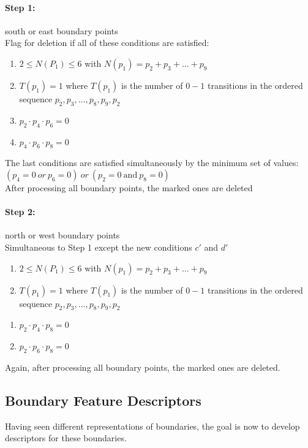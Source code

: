 \paragraph{Step 1:} south or east boundary points\\
Flag for deletion if all of these conditions are satisfied:
\begin{enumerate}[label={\alph*)}]
\item $2\leq N(P_1)\leq 6$ with $N(p_1)=p_2 + p_3 + \ldots + p_9$
\item $T(p_1)=1$ where $T(p_1)$ is the number of $0-1$ transitions in the ordered sequence $p_2,p_3,\ldots ,p_8,p_9,p_2$
\item $p_2 \cdot p_4 \cdot p_6 = 0$
\item $p_4 \cdot p_6 \cdot p_8 = 0$
\end{enumerate}
The last conditions are satisfied simultaneously by the minimum set of values: $(p_4=0\ or\ p_6=0)\ or \ (p_2=0\ \text{and} \ p_8=0)$\\
After processing all boundary points, the marked ones are deleted
\paragraph{Step 2:} north or west boundary points\\
Simultaneous to Step 1 except the new conditions $c'$ and $d'$\\
\begin{enumerate}[label={\alph*)}]
\item $2\leq N(P_1)\leq 6$ with $N(p_1)=p_2 + p_3 + \ldots + p_9$
\item $T(p_1)=1$ where $T(p_1)$ is the number of $0-1$ transitions in the ordered sequence $p_2,p_3,\ldots ,p_8,p_9,p_2$
\end{enumerate}
\begin{enumerate}[label={\alph*')},resume]
\item $p_2 \cdot p_4 \cdot p_8 = 0$
\item $p_2 \cdot p_6 \cdot p_8 = 0$
\end{enumerate}
Again, after processing all boundary points, the marked ones are deleted.

\subsection{Boundary Feature Descriptors}
\label{sec:boundaryFeatureDescriptors}
Having seen different representations of boundaries, the goal is now to develop descriptors for these boundaries.
